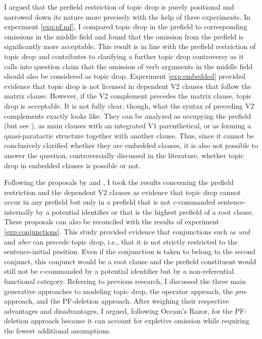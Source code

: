 I argued that the prefield restriction of topic drop is purely positional and narrowed down its nature more precisely with the help of three experiments.
In experiment \ref*{exp:pf.mf}, I compared topic drop in the prefield to corresponding omissions in the middle field  and found that the omission from the prefield is significantly more acceptable.
This result is in line with the prefield restriction of topic drop and contributes to clarifying a further topic drop controversy  as it calls into question  claim that the omission of verb arguments  in the middle field should also be considered as topic drop.
Experiment \ref*{exp:embedded} provided evidence that topic drop is not licensed in dependent V2 clauses that follow the matrix clause. 
However, if the V2 complement precedes the matrix clause, topic drop is acceptable.
It is not fully clear, though, what the syntax of preceding V2 complements exactly looks like.
They can be analyzed as occupying the prefield (but see \cite{reis1997}), as main clauses with an integrated V1 parenthetical, or as forming a quasi-paratactic structure together with another clause.
Thus, since it cannot be conclusively clarified whether they are embedded  clauses, it is also not possible to answer the question, controversially discussed in the literature, whether topic drop in embedded clauses is possible or not.

Following the proposals by \citet{rizzi1994} and \citet{freywald2020}, I took the results concerning the prefield restriction and the dependent V2 clauses as evidence that topic drop cannot occur in any prefield but only in a prefield that is not c-commanded sentence-internally by a potential identifier or that is the highest prefield of a root clause.
These proposals can also be reconciled with the results of experiment \ref*{exp:conjunctions}.
This study provided evidence that conjunctions  such as \textit{und} and \textit{aber} can precede topic drop, i.e., that it is not strictly restricted to the sentence-initial position.
Even if the conjunction  is taken to belong to the second conjunct, this conjunct would be a root clause and the prefield constituent would still not be c-commanded by a potential identifier but by a non-referential functional category.  
Referring to previous research, I discussed the three main generative approaches to modeling topic drop, the operator approach,  the \textit{pro}-approach,  and the PF-deletion approach. 
After weighing their respective advantages and disadvantages, I argued, following Occam's Razor,  for the PF-deletion approach  because it can account for expletive  omission while requiring the fewest additional assumptions.

